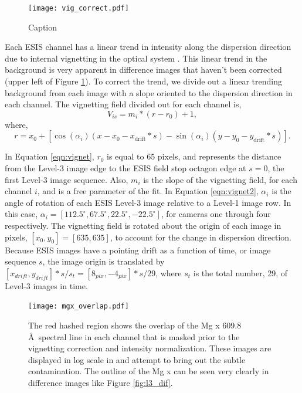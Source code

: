 { 		\begin{figure}[htb!]
			\centering
			\texttt{[image: vig\_correct.pdf]}
			\caption{Caption}
			\label{fig:vig_correct}
		\end{figure}
	       	
        Each ESIS channel has a linear trend in intensity along the dispersion direction due to internal vignetting in the optical system \citep{ESIS}.
        This linear trend in the background is very apparent in difference images that haven't been corrected (upper left of Figure \ref{fig:vig_correct}).
        To correct the trend, we divide out a linear trending background from each image with a slope oriented to the dispersion direction in each channel.
        The vignetting field divided out for each channel is,
        \begin{equation}
            V_{is} = m_{i} * (r - r_0) + 1,
            \label{eqn:vignet}
        \end{equation}
       	where,
       	\begin{equation}
       		r = x_0 + [\cos(\alpha_i)(x-x_0-x_{\text{drift}}*s) - \sin(\alpha_i)(y-y_0-y_{\text{drift}}*s)].
        	\label{eqn:vignet2}
       	\end{equation}
       	
       	In Equation \ref{eqn:vignet}, $r_0$ is equal to 65 pixels, and represents the distance from the Level-3 image edge to the ESIS field stop octagon edge at $s = 0$, the first Level-3 image sequence.
       	Also, $m_{i}$ is the slope of the vignetting field, for each channel $i$, and is a free parameter of the fit.
        In Equation \ref{eqn:vignet2},  $\alpha_i$ is the angle of rotation of each ESIS Level-3 image relative to a Level-1 image row.
        In this case, $\alpha_i = [112.5^{\circ}, 67.5^{\circ}, 22.5^{\circ}, -22.5^{\circ}]$, for cameras one through four respectively.
        The vignetting field is rotated about the origin of each image in pixels, $[x_0, y_0] = [635,635]$, to account for the change in dispersion direction.
        Because ESIS images have a pointing drift as a function of time, or image sequence $s$, the image origin is translated by $[x_{drift},y_{drift}]*s/s_t = [8_{pix},-4_{pix}]*s/29$, where $s_t $ is the total number, 29, of Level-3 images in time.
        
        \begin{figure}[htb!]
        	\centering
        	\texttt{[image: mgx\_overlap.pdf]}
        	\caption{The red hashed region shows the overlap of the Mg {\sc x} 609.8 \AA \ spectral line in each channel that is masked prior to the vignetting correction and intensity normalization. These images are displayed in log scale in and attempt to bring out the subtle contamination.  The outline of the Mg {\sc x} can be seen very clearly in difference images like Figure \ref{fig:l3_dif}. }


\end{figure}}
